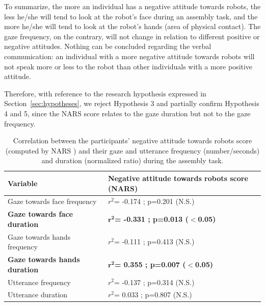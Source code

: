 \documentclass[twocolumn]{svjour3}          %
\begin{document}
To summarize, the more an individual has a negative attitude towards robots, the less he/she will tend to look at the robot's face during an assembly task, and the more he/she will tend to look at the robot's hands (area of physical contact). The gaze frequency, on the contrary, will not change in relation to different positive or negative attitudes. 
Nothing can be concluded regarding the verbal communication: an individual with a more negative attitude towards robots will not speak more or less to the robot than other individuals with a more positive attitude. 

Therefore, with reference to the research hypothesis expressed in Section~\ref{sec:hypotheses}, we reject Hypothesis 3
and partially confirm Hypothesis 4 and 5, since the NARS score relates to the gaze duration but not to the gaze frequency.


\begin{table}
\centering
\begin{tabular}{|p{6cm}|p{8cm}|}
\hline
Variable & \textbf{Negative attitude towards robots score (NARS)} \\
\hline
\hline
Gaze towards face frequency  &  $r^2$= -0.174 ; p=0.201 (N.S.) \\
\textbf{Gaze towards face duration}  & \textbf{$\mathbf{r^2}$= -0.331 ; p=0.013 ($\mathbf{<}$0.05)} \\
\hline
Gaze towards hands frequency  &  $r^2$= -0.111 ; p=0.413 (N.S.) \\
\textbf{Gaze towards hands duration}  & \textbf{$\mathbf{r^2}$= 0.355 ; p=0.007 ($\mathbf{<}$0.05)} \\
\hline
Utterance frequency  &	$r^2$= -0.137 ; p=0.314 (N.S.) \\
Utterance duration  &	$r^2$= 0.033 ; p=0.807 (N.S.) \\
\hline
\end{tabular}
\caption{Correlation between the participants' negative attitude towards robots score (computed by NARS \cite{NARS2006}) and their gaze and utterance frequency (number/seconds) and duration (normalized ratio) during the assembly task.}
\label{table:nars}
\end{table}
\end{document}

